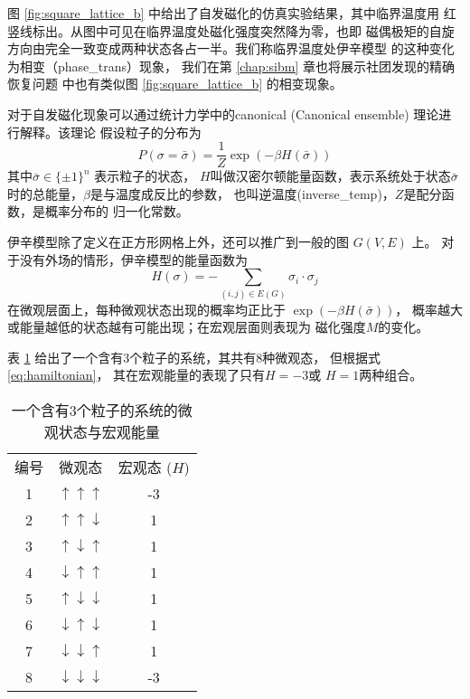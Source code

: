 图 \ref{fig:square_lattice_b} 中给出了自发磁化的仿真实验结果，其中临界温度用
红竖线标出。从图中可见在临界温度处磁化强度突然降为零，也即
磁偶极矩的自旋方向由完全一致变成两种状态各占一半。我们称临界温度处伊辛模型
的这种变化为相变（\glsdesc{phase_trans}）现象，
我们在第 \ref{chap:sibm} 章也将展示社团发现的精确恢复问题
中也有类似图 \ref{fig:square_lattice_b} 的相变现象。

对于自发磁化现象可以通过统计力学中的\gls{canonical} (Canonical ensemble)
理论进行解释。该理论
假设粒子的分布为
\begin{equation}\label{eq:canonical_ensemble}
P(\sigma = \bar{\sigma}) = \frac{1}{Z} \exp(-\beta H(\bar{\sigma}))
\end{equation}
其中$\bar{\sigma} \in \{\pm 1\}^n$ 表示粒子的状态，
$H$叫做汉密尔顿能量函数，表示系统处于状态$\bar{\sigma}$时的总能量，$\beta$是与温度成反比的参数，
也叫逆温度(\glsdesc{inverse_temp})，$Z$是配分函数，是概率分布的
归一化常数。


伊辛模型除了定义在正方形网格上外，还可以推广到一般的图 $G(V, E)$ 上。
对于没有外场的情形，伊辛模型的能量函数为
\begin{equation}\label{eq:hamiltonian}
	H(\sigma) = -\sum_{(i,j) \in E(G)} \sigma_i \cdot \sigma_j
\end{equation}
在微观层面上，每种微观状态出现的概率均正比于 $\exp(-\beta H(\bar{\sigma}))$，
概率越大或能量越低的状态越有可能出现；在宏观层面则表现为
磁化强度$M$的变化。

\begin{example}
  表 \ref{tab:particles_3} 给出了一个含有3个粒子的系统，其共有8种微观态，
  但根据式\eqref{eq:hamiltonian}， 其在宏观能量的表现了只有$H=-3$或 $H=1$两种组合。
\begin{table}
  \centering
\begin{tabular}{ccc}
		编号 & 微观态 & 宏观态 ($H$) \\
		1 & $\uparrow\uparrow\uparrow$ & -3 \\
		2 & $\uparrow\uparrow\downarrow$ & 1 \\
		3 & $\uparrow\downarrow\uparrow$ & 1 \\
		4 & $\downarrow\uparrow\uparrow$ & 1 \\
		5 & $\uparrow\downarrow\downarrow$ & 1    \\
6 & $\downarrow\uparrow\downarrow$ & 1 \\
7 & $\downarrow\downarrow\uparrow$ & 1 \\
8 & $\downarrow\downarrow\downarrow$ & -3 \\
\end{tabular}
\caption{一个含有3个粒子的系统的微观状态与宏观能量}
\label{tab:particles_3}
\end{table}
\end{example}

